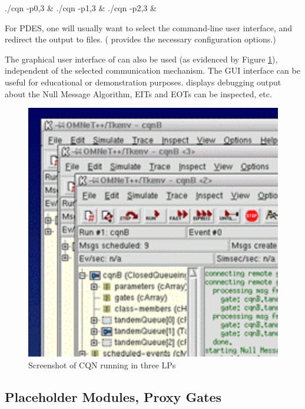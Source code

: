 \begin{commandline}
./cqn -p0,3 &
./cqn -p1,3 &
./cqn -p2,3 &
\end{commandline}

For PDES, one will usually want to select the command-line user interface,
and redirect the output to files. ({\opp} provides the necessary
configuration options.)

The graphical user interface of {\opp} can also be used
(as evidenced by Figure \ref{fig:parsim-screenshot}),
independent of the selected communication mechanism.
The GUI interface can be useful for educational or demonstration purposes.
{\opp} displays debugging output about the Null Message Algorithm,
EITs and EOTs can be inspected, etc.




\begin{figure}[htbp]
  \begin{center}
    \includegraphics{figures/parsim-screenshot}
    \caption{Screenshot of CQN running in three LPs}
    \label{fig:parsim-screenshot}
  \end{center}
\end{figure}



\subsection{Placeholder Modules, Proxy Gates}

